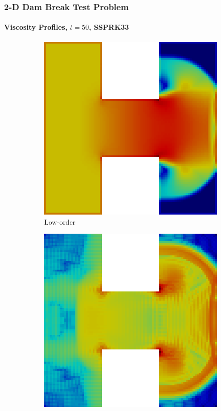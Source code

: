 \begin{frame}
\frametitle{2-D Dam Break Test Problem}
\framesubtitle{Viscosity Profiles, $t=50$, SSPRK33}

\begin{figure}[h]
   \centering
   \begin{subfigure}{0.49\textwidth}
      \centering
      \includegraphics[width=\textwidth]{./figures/dambreak2d_low_order_viscosity_logscale.png}
      \caption{Low-order}
   \end{subfigure}
   \begin{subfigure}{0.49\textwidth}
      \centering
      \includegraphics[width=\textwidth]{./figures/dambreak2d_entropy_viscosity_logscale.png}

\end{subfigure}
\end{figure}
\end{frame}
